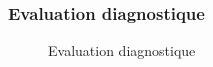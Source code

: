 \subsubsection*{Evaluation diagnostique}\label{Eval_diag_ju}
\begin{figure}[!h]
	\caption{Evaluation diagnostique}
\end{figure}
